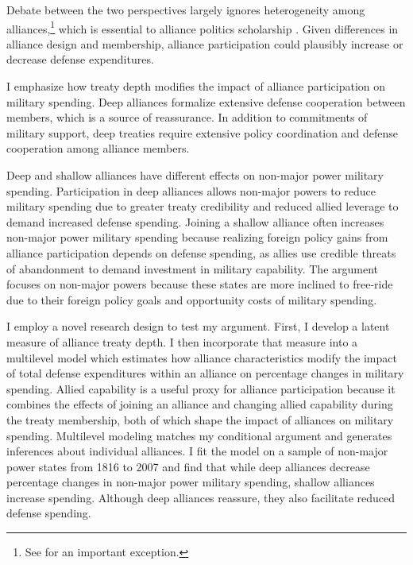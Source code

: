 \documentclass[12pt]{article}
\begin{document}
Debate between the two perspectives largely ignores heterogeneity among alliances,\footnote{See \citet{DigiuseppePoast2016} for an important exception.} which is essential to alliance politics scholarship \citep{Morrow1991, Leeds2003, LeedsAnac2005, Fordham2010, Mattes2012, Benson2012, Poast2013, Johnsonetal2015}.  
Given differences in alliance design and membership, alliance participation could plausibly increase or decrease defense expenditures. 


I emphasize how treaty depth modifies the impact of alliance participation on military spending. 
Deep alliances formalize extensive defense cooperation between members, which is a source of reassurance. 
In addition to commitments of military support, deep treaties require extensive policy coordination and defense cooperation among alliance members. 


Deep and shallow alliances have different effects on non-major power military spending. 
Participation in deep alliances allows non-major powers to reduce military spending due to greater treaty credibility and reduced allied leverage to demand increased defense spending. 
Joining a shallow alliance often increases non-major power military spending because realizing foreign policy gains from alliance participation depends on defense spending, as allies use credible threats of abandonment to demand investment in military capability.
The argument focuses on non-major powers because these states are more inclined to free-ride due to their foreign policy goals and opportunity costs of military spending.   
 

I employ a novel research design to test my argument.
First, I develop a latent measure of alliance treaty depth. 
I then incorporate that measure into a multilevel model which estimates how alliance characteristics modify the impact of total defense expenditures within an alliance on percentage changes in military spending.
Allied capability is a useful proxy for alliance participation because it combines the effects of joining an alliance and changing allied capability during the treaty membership, both of which shape the impact of alliances on military spending. 
Multilevel modeling matches my conditional argument and generates inferences about individual alliances. 
I fit the model on a sample of non-major power states from 1816 to 2007 and find that while deep alliances decrease percentage changes in non-major power military spending, shallow alliances increase spending.
Although deep alliances reassure, they also facilitate reduced defense spending. 
\end{document}
